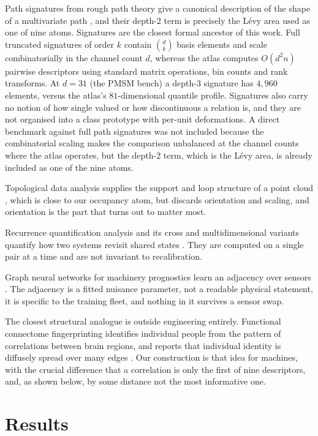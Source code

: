 \documentclass[11pt]{article}
\begin{document}
Path signatures from rough path theory give a canonical description of the
shape of a multivariate path \cite{lyons1998,lyons2007,chevyrev2016}, and their
depth-2 term is precisely the L\'evy area used as one of nine atoms. Signatures
are the closest formal ancestor of this work. Full truncated signatures of
order $k$ contain $\binom{d}{k}$ basis elements and scale combinatorially in
the channel count $d$, whereas the atlas computes $O(d^2 n)$ pairwise
descriptors using standard matrix operations, bin counts and rank transforms.
At $d = 31$ (the PMSM bench) a depth-3 signature has $4{,}960$ elements,
versus the atlas's $81$-dimensional quantile profile. Signatures also carry
no notion of how single valued or how discontinuous a relation is, and they
are not organised into a class prototype with per-unit deformations. A direct
benchmark against full path signatures was not included because the
combinatorial scaling makes the comparison unbalanced at the channel counts
where the atlas operates, but the depth-2 term, which is the L\'evy area, is
already included as one of the nine atoms.

Topological data analysis supplies the support and loop structure of a point
cloud \cite{edelsbrunner2008,carlsson2009,zomorodian2005}, which is close to
our occupancy atom, but discards orientation and scaling, and orientation is
the part that turns out to matter most.

Recurrence quantification analysis and its cross and multidimensional variants
quantify how two systems revisit shared states \cite{webber1994,marwan2007}.
They are computed on a single pair at a time and are not invariant to
recalibration.

Graph neural networks for machinery prognostics learn an adjacency over
sensors \cite{li2022graph,zhao2023}. The adjacency is a fitted nuisance
parameter, not a readable physical statement, it is specific to the training
fleet, and nothing in it survives a sensor swap.

The closest structural analogue is outside engineering entirely. Functional
connectome fingerprinting identifies individual people from the pattern of
correlations between brain regions, and reports that individual identity is
diffusely spread over many edges \cite{finn2015}. Our construction is that
idea for machines, with the crucial difference that a correlation is only the
first of nine descriptors, and, as shown below, by some distance not the most
informative one.

\section{Results}
\end{document}
